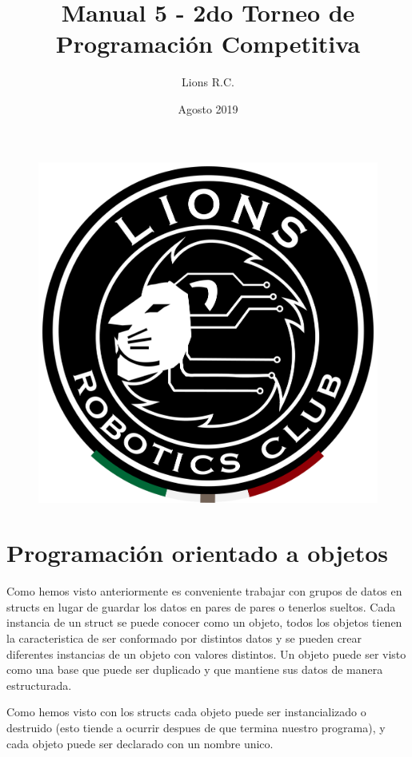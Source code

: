 \documentclass{article}
\title{Manual 5 - 2do Torneo de Programación Competitiva}
\author{Lions R.C.}
\date{Agosto 2019}
\begin{document}
\maketitle

\tableofcontents

\begin{figure}[H]
    \centering
    \includegraphics[width=0.2\paperwidth]{newblack}
\end{figure}

\section{Programación orientado a objetos}

Como hemos visto anteriormente es conveniente trabajar con grupos de datos en structs en lugar de guardar los datos en pares de pares o tenerlos sueltos. Cada instancia de un struct se puede conocer como un objeto, todos los objetos tienen la caracteristica de ser conformado por distintos datos y se pueden crear diferentes instancias de un objeto con valores distintos. Un objeto puede ser visto como una base que puede ser duplicado y que mantiene sus datos de manera estructurada.

Como hemos visto con los structs cada objeto puede ser instancializado o destruido (esto tiende a ocurrir despues de que termina nuestro programa), y cada objeto puede ser declarado con un nombre unico.
\end{document}
